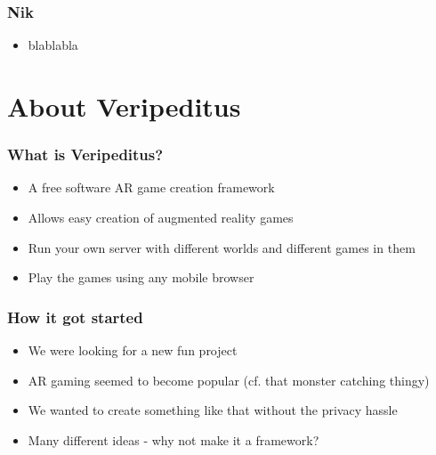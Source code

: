 \documentclass[aspectratio=43]{beamer}
\begin{document}
 \begin{frame}
  \frametitle{Nik}

  \begin{itemize}
   \item{blablabla}
  \end{itemize}
 \end{frame}

 \section{About Veripeditus}

 \begin{frame}
  \frametitle{What is Veripeditus?}

  \begin{itemize}
   \item{A free software AR game creation framework}
   \item{Allows easy creation of augmented reality games}
   \item{Run your own server with different worlds and different games in them}
   \item{Play the games using any mobile browser}
  \end{itemize}
 \end{frame}


 \begin{frame}
  \frametitle{How it got started}

  \begin{itemize}
   \item{We were looking for a new fun project}
   \item{AR gaming seemed to become popular (cf. that monster catching thingy)}
   \item{We wanted to create something like that without the privacy hassle}
   \item{Many different ideas - why not make it a framework?}
  \end{itemize}
 \end{frame}
\end{document}
